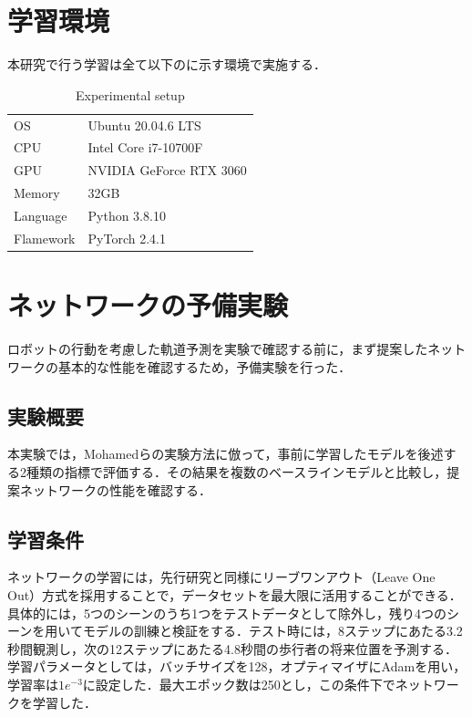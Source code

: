 \newpage

\section{学習環境}
本研究で行う学習は全て以下のに示す環境で実施する．

\begin{table}[hbtp]
  \centering
  \caption{Experimental setup}
  \label{tab:environment}
  \begin{tabular}{ll}
    \hline
    OS & Ubuntu 20.04.6 LTS \\
    CPU & Intel Core i7-10700F \\
    GPU & NVIDIA GeForce RTX 3060 \\
    Memory & 32GB \\
    Language & Python 3.8.10 \\
    Flamework & PyTorch 2.4.1 \\
    \hline
  \end{tabular}
\end{table}

\section{ネットワークの予備実験}
ロボットの行動を考慮した軌道予測を実験で確認する前に，まず提案したネットワークの基本的な性能を確認するため，予備実験を行った．

\subsection{実験概要}
本実験では，Mohamedら\cite{s-stgcnn}の実験方法に倣って，事前に学習したモデルを後述する2種類の指標で評価する．その結果を複数のベースラインモデルと比較し，提案ネットワークの性能を確認する．

\subsection{学習条件}
ネットワークの学習には，先行研究\cite{s-lstm,s-stgcnn}と同様にリーブワンアウト（Leave One Out）方式を採用することで，データセットを最大限に活用することができる．
具体的には，5つのシーンのうち1つをテストデータとして除外し，残り4つのシーンを用いてモデルの訓練と検証をする．テスト時には，8ステップにあたる3.2秒間観測し，次の12ステップにあたる4.8秒間の歩行者の将来位置を予測する．学習パラメータとしては，バッチサイズを128，オプティマイザにAdam\cite{kingma2014adam}を用い，学習率は$1e^{-3}$に設定した．最大エポック数は250とし，この条件下でネットワークを学習した．


